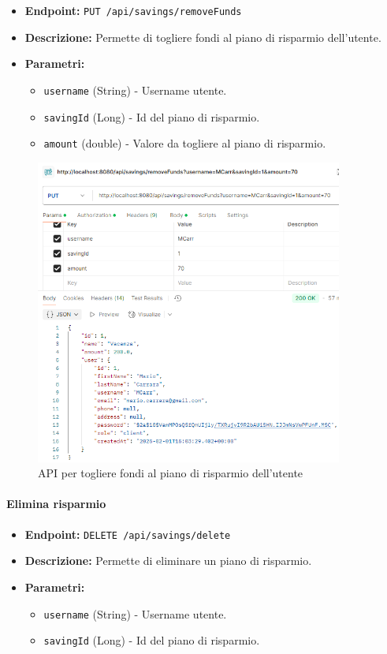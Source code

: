\begin{itemize}
    \item \textbf{Endpoint:} \texttt{PUT /api/savings/removeFunds}
    \item \textbf{Descrizione:} Permette di togliere fondi al piano di risparmio dell'utente.
    \item \textbf{Parametri:}
    \begin{itemize}
        \item \texttt{username} (String) - Username utente.
        \item \texttt{savingId} (Long) - Id del piano di risparmio.
        \item \texttt{amount} (double) - Valore da togliere al piano di  risparmio.
    \end{itemize}
\end{itemize}

\begin{figure}[H]
    \centering
    \includegraphics[width=0.9\textwidth]{images/RemoveFundsSavingAPI.png}
    \caption{API per togliere fondi al piano di risparmio dell'utente}
    \label{fig:RemoveFundsSavingAPI}
\end{figure}

\paragraph{Elimina risparmio}

\begin{itemize}
    \item \textbf{Endpoint:} \texttt{DELETE /api/savings/delete}
    \item \textbf{Descrizione:} Permette di eliminare un piano di risparmio.
    \item \textbf{Parametri:}
    \begin{itemize}
        \item \texttt{username} (String) - Username utente.
        \item \texttt{savingId} (Long) - Id del piano di risparmio.
    \end{itemize}
\end{itemize}


